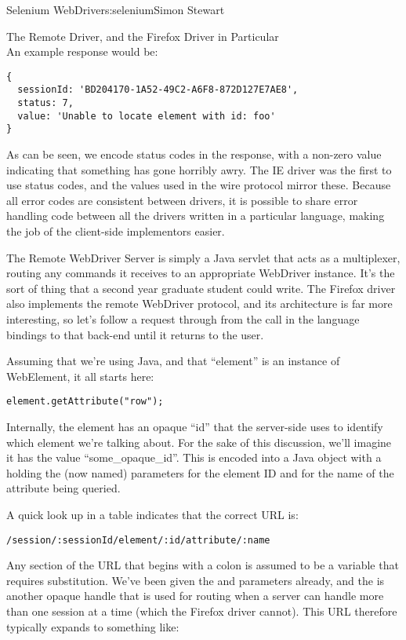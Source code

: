 \begin{aosachapter}{Selenium WebDriver}{s:selenium}{Simon Stewart}
\begin{aosasect1}{The Remote Driver, and the Firefox Driver in Particular}
~\\

\noindent
An example response would be:

\begin{verbatim}
{
  sessionId: 'BD204170-1A52-49C2-A6F8-872D127E7AE8',
  status: 7,
  value: 'Unable to locate element with id: foo'
}
\end{verbatim}

\noindent As can be seen, we encode status codes in the response, with a
non-zero value indicating that something has gone horribly awry. The
IE driver was the first to use status codes, and the values used in
the wire protocol mirror these. Because all error codes are consistent
between drivers, it is possible to share error handling code between
all the drivers written in a particular language, making the job of
the client-side implementors easier.

The Remote WebDriver Server is simply a Java servlet that acts as a
multiplexer, routing any commands it receives to an appropriate
WebDriver instance. It's the sort of thing that a second year graduate
student could write. The Firefox driver also implements the remote
WebDriver protocol, and its architecture is far more interesting, so
let's follow a request through from the call in the language bindings
to that back-end until it returns to the user.

\pagebreak

Assuming that we're using Java, and that ``element'' is an instance of
WebElement, it all starts here:

\begin{verbatim}
element.getAttribute("row");
\end{verbatim}

\noindent Internally, the element has an opaque ``id'' that the server-side uses
to identify which element we're talking about. For the sake of this
discussion, we'll imagine it has the value ``some\_opaque\_id''. This
is encoded into a Java  object with a  holding
the (now named) parameters  for the element ID
and  for the name of the attribute being queried.

A quick look up in a table indicates that the correct URL is:

\begin{verbatim}
/session/:sessionId/element/:id/attribute/:name
\end{verbatim}

\noindent Any section of the URL that begins with a colon is assumed to be a
variable that requires substitution. We've been given the 
and  parameters already, and the  is
another opaque handle that is used for routing when a server can
handle more than one session at a time (which the Firefox driver
cannot). This URL therefore typically expands to something like:


\end{aosasect1}
\end{aosachapter}
